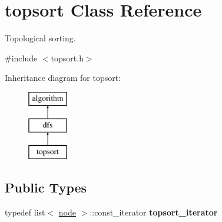 \hypertarget{classtopsort}{}\section{topsort Class Reference}
\label{classtopsort}


Topological sorting.  




{\ttfamily \#include $<$topsort.\+h$>$}

Inheritance diagram for topsort\+:\begin{figure}[H]
\begin{center}
\leavevmode
\includegraphics[height=3.000000cm]{classtopsort}
\end{center}
\end{figure}
\subsection*{Public Types}
\begin{DoxyCompactItemize}
\item 
\mbox{\label{classtopsort_aaaa250b99c25e7d045b8adf72707fc32}} 
typedef list$<$ \mbox{\hyperlink{classnode}{node}} $>$\+::const\+\_\+iterator {\bfseries topsort\+\_\+iterator}
\end{DoxyCompactItemize}
